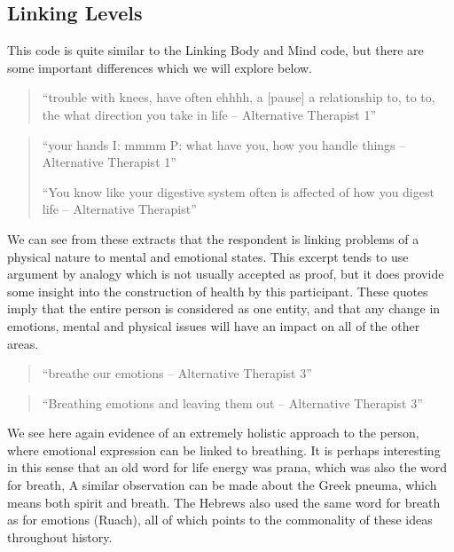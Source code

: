 \subsection{Linking Levels}

This code is quite similar to the Linking Body and Mind code, but there are some important differences which we will explore below. 

\begin{quotation}
``trouble with knees, have often ehhhh, a [pause] a relationship to, to to, the what direction you take in life – Alternative Therapist 1''
  
\end{quotation}

\begin{quotation}
``your hands 
I: mmmm
P: what have you, how you handle things – Alternative Therapist 1''

``You know like your digestive system often is affected of how you digest life – Alternative Therapist''  
\end{quotation}



We can see from these extracts that the respondent is linking problems of a physical nature to mental and emotional states. This excerpt tends to use argument by analogy which is not usually accepted as proof, but it does provide some insight into the construction of health by this participant. These quotes imply that the entire person is considered as one entity, and that any change in emotions, mental and physical issues will have an impact on all of the other areas. 

\begin{quotation}
``breathe our emotions – Alternative Therapist 3''  
\end{quotation}


\begin{quotation}
  ``Breathing emotions and leaving them out – Alternative Therapist 3''
\end{quotation}

We see here again evidence of an extremely holistic approach to the person, where emotional expression can be linked to breathing. It is perhaps interesting in this sense that an old word for life energy was prana, which was also the word for breath, A similar observation can be made about the Greek pneuma, which means both spirit and breath. The Hebrews also used the same word for breath as for emotions (Ruach), all of which points to the commonality of these ideas throughout history. 

